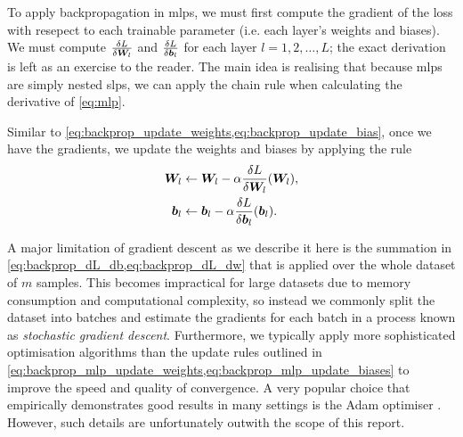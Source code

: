 \documentclass[../main.tex]{subfiles}
\begin{document}
\subsubsection{}
\label{sec:mlp_training}
To apply backpropagation in \glspl{mlp}, we must first compute the gradient of the loss with resepect to each trainable parameter (i.e. each layer's weights and biases).
We must compute $\frac{\delta L}{\delta {\bm{W}}_l}$ and $\frac{\delta L}{\delta {\bm{b}}_l}$ for each layer $l=1,2,\dots,L$; the exact derivation is left as an exercise to the reader.
The main idea is realising that because \glspl{mlp} are simply nested \glspl{slp}, we can apply the chain rule when calculating the derivative of \cref{eq:mlp}.

Similar to \cref{eq:backprop_update_weights,eq:backprop_update_bias}, once we have the gradients, we update the weights and biases by applying the rule
\begin{align}
    \label{eq:backprop_mlp_update_weights}
    {\bm{W}}_l &\gets {\bm{W}}_l - \alpha \frac{\delta L}{\delta {\bm{W}}_l}({\bm{W}}_l),\\
    \label{eq:backprop_mlp_update_biases}
    {\bm{b}}_l &\gets {\bm{b}}_l - \alpha \frac{\delta L}{\delta {\bm{b}}_l}({\bm{b}}_l).
\end{align}

A major limitation of gradient descent as we describe it here is the summation in \cref{eq:backprop_dL_db,eq:backprop_dL_dw} that is applied over the whole dataset of $m$ samples. 
This becomes impractical for large datasets due to memory consumption and computational complexity, so instead we commonly split the dataset into batches and estimate the gradients for each batch in a process known as \emph{stochastic gradient descent}.
Furthermore, we typically apply more sophisticated optimisation algorithms than the update rules outlined in \cref{eq:backprop_mlp_update_weights,eq:backprop_mlp_update_biases} to improve the speed and quality of convergence.
A very popular choice that empirically demonstrates good results in many settings is the Adam optimiser \cite{kingma2017}.
However, such details are unfortunately outwith the scope of this report.
\end{document}
